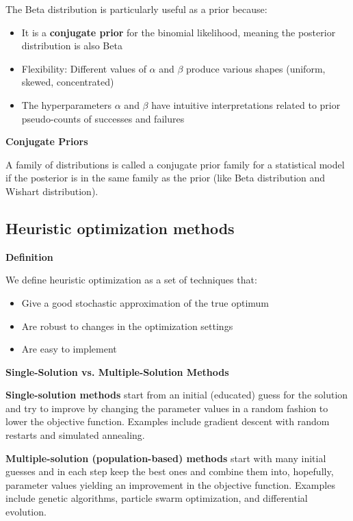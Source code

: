 \documentclass[12pt,a4paper]{article}
\begin{document}
\vspace{0.5em}

The Beta distribution is particularly useful as a prior because:
\begin{itemize}
    \item It is a \textbf{conjugate prior} for the binomial likelihood, meaning the posterior distribution is also Beta
    \item Flexibility: Different values of $\alpha$ and $\beta$ produce various shapes (uniform, skewed, concentrated)
    \item The hyperparameters $\alpha$ and $\beta$ have intuitive interpretations related to prior pseudo-counts of successes and failures
\end{itemize}

\vspace{0.5em}

\textbf{Conjugate Priors}

A family of distributions is called a conjugate prior family for a statistical model if the posterior is in the same family as the prior (like Beta distribution and Wishart distribution).

\subsection{Heuristic optimization methods}

\textbf{Definition}

We define heuristic optimization as a set of techniques that:
\begin{itemize}
    \item[i)] Give a good stochastic approximation of the true optimum
    \item[ii)] Are robust to changes in the optimization settings
    \item[iii)] Are easy to implement
\end{itemize}

\vspace{0.5em}

\textbf{Single-Solution vs. Multiple-Solution Methods}

\textbf{Single-solution methods} start from an initial (educated) guess for the solution and try to improve by changing the parameter values in a random fashion to lower the objective function. Examples include gradient descent with random restarts and simulated annealing.

\textbf{Multiple-solution (population-based) methods} start with many initial guesses and in each step keep the best ones and combine them into, hopefully, parameter values yielding an improvement in the objective function. Examples include genetic algorithms, particle swarm optimization, and differential evolution.
\end{document}
